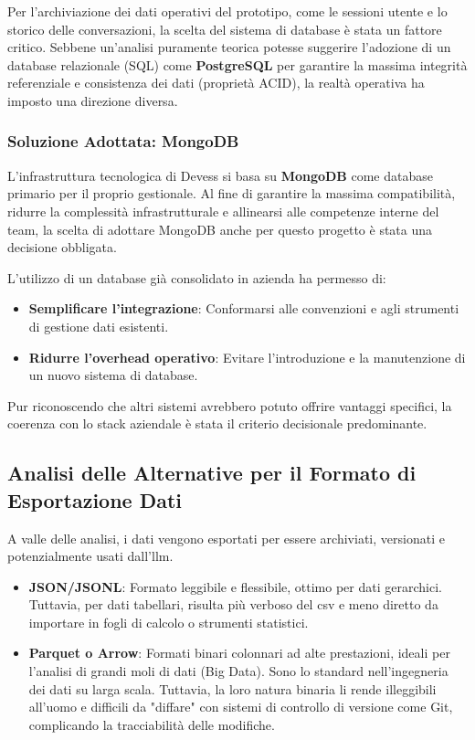 Per l'archiviazione dei dati operativi del prototipo, come le sessioni utente e lo storico delle conversazioni, la scelta del sistema di database è stata un fattore critico. Sebbene un'analisi puramente teorica potesse suggerire l'adozione di un database relazionale (SQL) come \textbf{PostgreSQL} per garantire la massima integrità referenziale e consistenza dei dati (proprietà ACID), la realtà operativa ha imposto una direzione diversa.

\subsubsection{Soluzione Adottata: MongoDB}
L'infrastruttura tecnologica di Devess si basa su \textbf{MongoDB} come database primario per il proprio gestionale. Al fine di garantire la massima compatibilità, ridurre la complessità infrastrutturale e allinearsi alle competenze interne del team, la scelta di adottare MongoDB anche per questo progetto è stata una decisione obbligata.

L'utilizzo di un database già consolidato in azienda ha permesso di:
\begin{itemize}
    \item \textbf{Semplificare l'integrazione}: Conformarsi alle convenzioni e agli strumenti di gestione dati esistenti.
    \item \textbf{Ridurre l'overhead operativo}: Evitare l'introduzione e la manutenzione di un nuovo sistema di database.
\end{itemize}
Pur riconoscendo che altri sistemi avrebbero potuto offrire vantaggi specifici, la coerenza con lo stack aziendale è stata il criterio decisionale predominante.

\subsection{Analisi delle Alternative per il Formato di Esportazione Dati}

A valle delle analisi, i dati vengono esportati per essere archiviati, versionati e potenzialmente usati dall'\gls{llm}.
\begin{itemize}
    \item \textbf{JSON/JSONL}: Formato leggibile e flessibile, ottimo per dati gerarchici. Tuttavia, per dati tabellari, risulta più verboso del \gls{csv} e meno diretto da importare in fogli di calcolo o strumenti statistici.
    \item \textbf{Parquet o Arrow}: Formati binari colonnari ad alte prestazioni, ideali per l'analisi di grandi moli di dati (Big Data). Sono lo standard nell'ingegneria dei dati su larga scala. Tuttavia, la loro natura binaria li rende illeggibili all'uomo e difficili da "diffare" con sistemi di controllo di versione come Git, complicando la tracciabilità delle modifiche.
\end{itemize}

